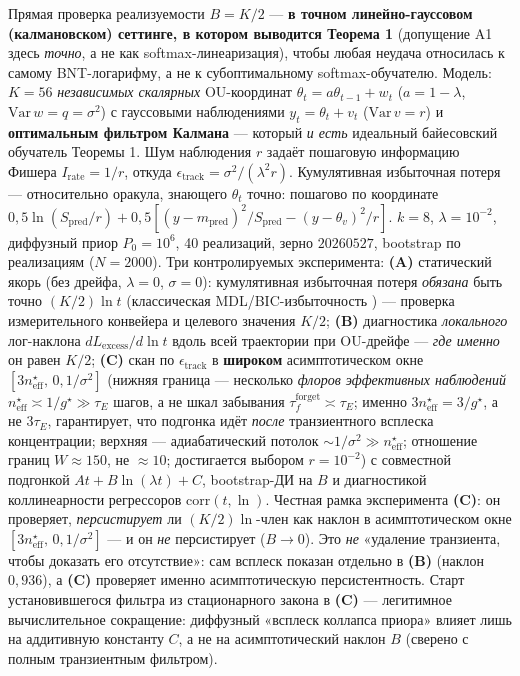 \documentclass[12pt]{iopart}
\begin{document}
Прямая проверка реализуемости \(B = K/2\) --- \textbf{в точном линейно-гауссовом (калмановском) сеттинге, в котором выводится Теорема 1} (допущение A1 здесь \emph{точно}, а не как softmax-линеаризация), чтобы любая неудача относилась к самому BNT-логарифму, а не к субоптимальному softmax-обучателю. Модель: \(K = 56\) \emph{независимых скалярных} OU-координат \(\theta_t = a\theta_{t-1} + w_t\) (\(a = 1-\lambda\), \(\mathrm{Var}\,w = q = \sigma^2\)) с гауссовыми наблюдениями \(y_t = \theta_t + v_t\) (\(\mathrm{Var}\,v = r\)) и \textbf{оптимальным фильтром Калмана} --- который \emph{и есть} идеальный байесовский обучатель Теоремы 1. Шум наблюдения \(r\) задаёт пошаговую информацию Фишера \(I_{\text{rate}} = 1/r\), откуда \(\epsilon_{\text{track}} = \sigma^2/(\lambda^2 r)\). Кумулятивная избыточная потеря --- относительно оракула, знающего \(\theta_t\) точно: пошагово по координате \(0{,}5\ln(S_{\text{pred}}/r) + 0{,}5[(y-m_{\text{pred}})^2/S_{\text{pred}} - (y-\theta_v)^2/r]\). \(k = 8\), \(\lambda = 10^{-2}\), диффузный приор \(P_0 = 10^6\), 40 реализаций, зерно \(20260527\), bootstrap по реализациям (\(N = 2000\)). Три контролируемых эксперимента: \textbf{(A)} статический якорь (без дрейфа, \(\lambda = 0\), \(\sigma = 0\)): кумулятивная избыточная потеря \emph{обязана} быть точно \((K/2)\ln t\) (классическая MDL/BIC-избыточность \cite{Rissanen1986,ClarkeBarron1990}) --- проверка измерительного конвейера и целевого значения \(K/2\); \textbf{(B)} диагностика \emph{локального} лог-наклона \(dL_{\text{excess}}/d\ln t\) вдоль всей траектории при OU-дрейфе --- \emph{где именно} он равен \(K/2\); \textbf{(C)} скан по \(\epsilon_{\text{track}}\) в \textbf{широком} асимптотическом окне \([3n_{\text{eff}}^\star,\,0{,}1/\sigma^2]\) (нижняя граница --- несколько \emph{флоров эффективных наблюдений} \(n_{\text{eff}}^\star\asymp 1/g^\star \gg \tau_E\) шагов, а не шкал забывания \(\tau_f^{\text{forget}}\asymp\tau_E\); именно \(3n_{\text{eff}}^\star = 3/g^\star\), а не \(3\tau_E\), гарантирует, что подгонка идёт \emph{после} транзиентного всплеска концентрации; верхняя --- адиабатический потолок \(\sim 1/\sigma^2 \gg n_{\text{eff}}^\star\); отношение границ \(W \approx 150\), не \(\approx 10\); достигается выбором \(r = 10^{-2}\)) с совместной подгонкой \(A t + B\ln(\lambda t) + C\), bootstrap-ДИ на \(B\) и диагностикой коллинеарности регрессоров \(\mathrm{corr}(t,\ln)\). Честная рамка эксперимента \textbf{(C)}: он проверяет, \emph{персистирует} ли \((K/2)\ln\)-член как наклон в асимптотическом окне \([3n_{\text{eff}}^\star,\,0{,}1/\sigma^2]\) --- и он \emph{не} персистирует (\(B \to 0\)). Это \emph{не} «удаление транзиента, чтобы доказать его отсутствие»: сам всплеск показан отдельно в \textbf{(B)} (наклон \(0{,}936\)), а \textbf{(C)} проверяет именно асимптотическую персистентность. Старт установившегося фильтра из стационарного закона в \textbf{(C)} --- легитимное вычислительное сокращение: диффузный «всплеск коллапса приора» влияет лишь на аддитивную константу \(C\), а не на асимптотический наклон \(B\) (сверено с полным транзиентным фильтром).
\end{document}
